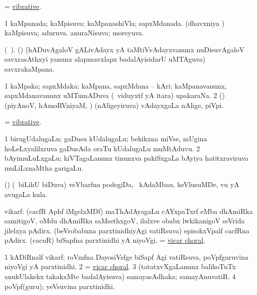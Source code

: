 \bentry
{} 
\gl{\gu}
\expl{}
\bmng
 = \hyperlink{vibrative}{vibrative}. 
\emng
\eentry

\bentry
{} 
\gl{\gu}
\expl{}
\bmng
\bnum
\num{1} kaMpanada; kaMpisuva; kaMpanashiVla; sapxMdanada. 
 (dhavxniya \vi) 
\banum
{} kaMpisuva; aduruva. 
 anuraNisuva; moreyuva. 
\eanum
\numie
\enum
\emng
\eentry

\bentry
{} 
\gl{\nA}(\bava\ ). 
\bmng
 (\saM) (hADuvAgaloV gALivAdayx yA taMtiVvAdayxvanunx nuDisuvAgaloV savxrasAthxyi yanunx alapxsavxlapx badalAyisidarU uMTAguva) savxrakaMpana. 
\emng
\eentry

\bentry
{} 
\gl{\nA}
\expl{}
\bmng
\bnum
\num{1} kaMpaka; sapxMdaka; kaMpana, sapxMdana -- kAri; kaMpanavanunx, sapxMdanavanunx uMTumADuva (\kanmu\ viduyxtf yA itara) upakaraNa. 
\num{2} (\saM) (piyAnoV, hAmoRVniyaM, \mo) (nAligeyiruva) vAdayxgaLa nAlige, piVpi. 
\enum
\emng
\eentry

\bentry
{} 
\gl{\gu}
\expl{}
\bmng
 = \hyperlink{vibrative}{vibrative}. 
\emng
\eentry

\bentry
{} 
\gl{\nA}
\expl{(\bava)}
\bmng
\bnum
\num{1} birugUdalugaLu; gaDusu kUdalugaLu; bekikxna miVse, mUgina hoLeLxyalilxruva gaDusAda oraTu kUdalugaLu muMtAduvu. 
\num{2} bAyimuLuLxgaLu; kiVTagaLanunx tinunxva pakiSxgaLa bAyiya hatitxraviruva muLiLxnaMtha garigaLu. 
\enum
\emng
\eentry

\bentry
{} 
\gl{\nA}
\expl{}
\bmng
 (\savi) (\sA\ biLihU biDuva) veYbarfna podegiDa, \udA\ kAdaMbau, heVlusuMDe, \mo vu yA avugaLa kula. 
\emng
\eentry

\bentry
{}
\gl{\saMkiSx}
\expl{}
\bmng
\emng
\eentry

\bentry
{} 
\gl{\nA}
\expl{}
\bmng
 vikarf: 
\banum
{} (cacfR Aphf iMgelxMDf) maThAdAyagaLu cAYxpaTxrf eMba dhAmiRka samitigoV, oMdu dhAmiRka saMsethxgoV, ilalxve obabx lwkikanigoV seVrida jilelxya pAdirx. 
 (beVrobabxna parxtinidhiyAgi vatiRsuva) episokxVpalf cacfRna pAdirx. 
 (\roVkAyx cacuR) biSapfna parxtinidhi yA niyoVgi. 
 = \hyperlink{vicar choral}{vicar choral}. 
\eanum
\emng

\noindent
\gl{\pagu}
\expl{}
\bmng
\bnum
\num{1} kADiRnalf vikarf; roVmfna DayosiVsfge biSapf Agi vatiRsuva, poVpfguruvina niyoVgi yA parxtinidhi. 
\num{2}  = \hyperlink{vicar choral}{vicar choral}. 
\num{3}  (tatatxvXgaLanunx balikoTuTx anukUlakekx takakxMte badalAyisuva) samayasAdhaka; samayAnuvatiR. 
\num{4}  poVpf(guru); yeVsuvina parxtinidhi. 
\enum
\emng
\eentry

